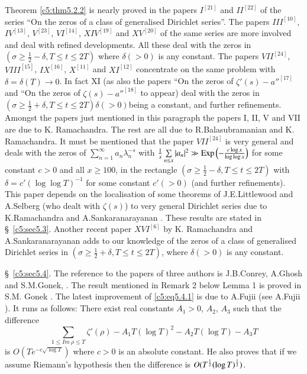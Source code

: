 Theorem \ref{c5:thm5.2.2} is nearly proved in the papers $I^{[21]}$
and $II^{[22]}$ of the series ``On the zeros of a class of generalised
Dirichlet series''. The papers $III^{[10]}$, $IV^{[13]}$, $V^{[23]}$,
$VI^{[14]}$, $XIV^{[19]}$ and $XV^{[20]}$ of the same series are more
involved and deal with refined developments. All these deal with the
zeros in $(\sigma\geq \frac{1}{2}-\delta,T\leq t\leq 2T)$ where
$\delta(>0)$ is any constant. The papers $VII^{[24]}$, $VIII^{[15]}$,
$IX^{[16]}$, $X^{[11]}$ and $XI^{[12]}$ concentrate on the same
problem with $\delta=\delta(T)\to 0$. In fact XI (as also the papers
``On the zeros of $\zeta'(s)-{a''}^{[17]}$ and ``On the zeros of
$\zeta(s)-{a''}^{[18]}$ to appear) deal with the zeros in $(\sigma\geq
\frac{1}{2}+\delta,T\leq t\leq 2T)\delta(>0)$\pageoriginale being a
constant, and further refinements. Amongst the papers just mentioned
in this paragraph the papers I, II, V and VII are due to K.\@
Ramachandra. The rest are all due to R.\@ Balasubramanian and K.\@
Ramachandra. It must be mentioned that the paper $VII^{[24]}$ is very
general and deals with the zeros of
$\sum\limits^{\infty}_{n=1}a_{n}\lambda^{-s}_{n}$ with
$\frac{1}{x}\sum\limits_{n\leq x}|a_{n}|^{2}\gg \operatorname{Exp}
\left(-\frac{c\log x}{\log\log x}\right)$ for some constant $c>0$ and
all $x\geq 100$, in the rectangle $(\sigma\geq
\frac{1}{2}-\delta,T\leq t\leq 2T)$ with $\delta=c'(\log\log T)^{-1}$
for some constant $c'(>0)$ (and further refinements). This paper
depends on the localisation of some theorems of J.E.\@ Littlewood and
A.\@ Selberg (who dealt with $\zeta(s)$) to very general Dirichlet
series due to K.\@ Ramachandra and A.\@ Sankaranarayanan \cite{Ramachandra and Sankaranarayanan3} \cite{Ramachandra and Sankaranarayanan5}. These results are stated in
\S\ \ref{c5:sec5.3}. Another recent paper $XVI^{[6]}$ by K.\@
Ramachandra and A.\@ Sankaranarayanan adds to our knowledge of the
zeros of a class of generalised Dirichlet series in $(\sigma\geq
\frac{1}{2}+\delta,T\leq t\leq 2T)$, where $\delta(>0)$ is any
constant.

\S\ \ref{c5:sec5.4}. The reference to the papers of three authors
is J.B.\@ Conrey, A.\@ Ghosh and S.M.\@ Gonek, \cite{Conrey Ghosh and Gonek1}. The result
mentioned in Remark 2 below Lemma 1 is proved in S.M. Gonek
\cite{Gonek1}. The latest improvement of \eqref{c5:eq5.4.1} is due to
A.\@ Fujii (see A.\@ Fujii \cite{Fujii1}). It runs as follows: There
exist real constants $A_{1}>0$, $A_{2}$, $A_{3}$ such that the
difference
$$
\sum_{1\leq Im\ \rho\leq T}\zeta'(\rho)-A_{1}T(\log T)^{2}-A_{2}T(\log
T)-A_{3}T
$$
is $O(Te^{-c\sqrt{\log T}})$ where $c>0$ is an absolute constant. He
also proves that if we assume Riemann's hypothesis then the difference
is $O(T^{\frac{1}{2}}\break(\log T)^{\frac{1}{2}})$. 
